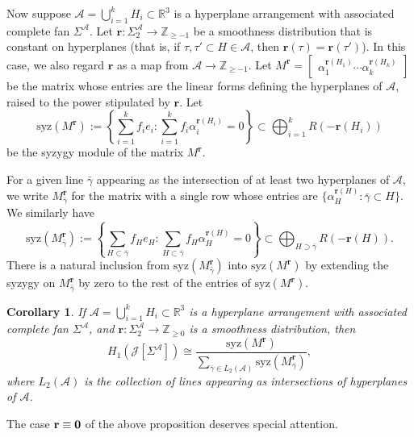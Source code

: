 \documentclass[11pt, reqno]{amsart}
\newcommand{\RR}{\mathbb{R}}
\newcommand{\ZZ}{\mathbb{Z}}
\newcommand{\br}{\mathbf{r}}
\newcommand{\calJ}{\mathcal{J}}
\newcommand{\A}{\mathcal{A}}
\newcommand{\syz}{\mathrm{syz}}
\newtheorem{corollary}[theorem]{Corollary}
\theoremstyle{definition}
\theoremstyle{remark}
\numberwithin{equation}{section}
\begin{document}
Now suppose $\A=\bigcup_{i=1}^k H_i\subset\RR^3$ is a hyperplane arrangement with associated complete fan $\Sigma^\A$.  Let $\br:\Sigma^\A_2\to \ZZ_{\ge -1}$ be a smoothness distribution that is constant on hyperplanes (that is, if $\tau,\tau'\subset H\in\A$, then $\br(\tau)=\br(\tau')$).  In this case, we also regard $\br$ as a map from $\A\to\ZZ_{\ge -1}$.  Let $M^{\br}=\begin{bmatrix} \alpha_1^{\br(H_1)} \cdots \alpha_k^{\br(H_k)} \end{bmatrix}$ be the matrix whose entries are the linear forms defining the hyperplanes of $\A$, raised to the power stipulated by $\br$.  Let
\[
\syz(M^{\br}):=\left\lbrace\sum_{i=1}^k f_ie_i: \sum_{i=1}^k f_i\alpha_i^{\br(H_i)}=0\right\rbrace\subset \bigoplus_{i=1}^k R(-\br(H_i))
\]
be the syzygy module of the matrix $M^{\br}$.  

For a given line $\bar{\gamma}$ appearing as the intersection of at least two hyperplanes of $\A$, we write $M^{\br}_{\bar{\gamma}}$ for the matrix with a single row whose entries are $\{\alpha_{H}^{\br(H)}:\bar{\gamma}\subset H\}$.  We similarly have
\[
\syz(M^{\br}_{\bar{\gamma}}):=\left\lbrace\sum_{H\subset \bar{\gamma}} f_He_H: \sum_{H\subset \bar{\gamma}} f_H\alpha_H^{\br(H)}=0\right\rbrace\subset \bigoplus_{H\supset\bar{\gamma}} R(-\br(H)).
\]
There is a natural inclusion from $\syz(M^{\br}_{\bar{\gamma}})$ into $\syz(M^{\br})$ by extending the syzygy on $M^{\br}_{\bar{\gamma}}$ by zero to the rest of the entries of $\syz(M^{\br})$.

\begin{corollary}\label{cor:HyperplaneH1pres}
If $\A=\bigcup_{i=1}^k H_i\subset\RR^3$ is a hyperplane arrangement with associated complete fan $\Sigma^\A$, and $\br:\Sigma^{\A}_2\to\ZZ_{\ge 0}$ is a smoothness distribution, then
\[
H_1(\calJ[\Sigma^\A])\cong \dfrac{\syz (M^\br)}{\sum_{\bar{\gamma}\in L_2(\A)} \syz(M^{\br}_{\bar{\gamma}})},
\]
where $L_2(\A)$ is the collection of lines appearing as intersections of hyperplanes of $\A$.
\end{corollary}

The case $\br\equiv \bf{0}$ of the above proposition deserves special attention.
\end{document}
